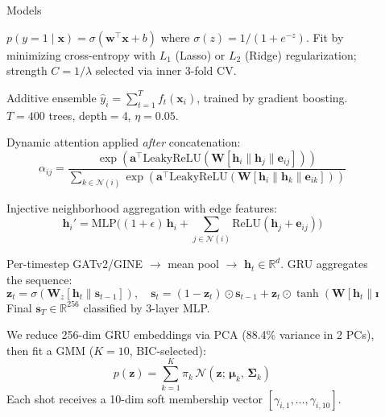 \documentclass[final]{beamer}
\newlength{\sepwidth}
\newlength{\colwidth}
\newcommand{\separatorcolumn}{\begin{column}{\sepwidth}\end{column}}
\begin{document}
\begin{frame}[t]
\begin{columns}[t]
\begin{column}{\colwidth}
\end{column}

\separatorcolumn

\begin{column}{\colwidth}

  \begin{block}{Models}

    $p(y{=}1 \mid \mathbf{x}) = \sigma(\mathbf{w}^\top\mathbf{x} + b)$ where $\sigma(z) = 1/(1+e^{-z})$. Fit by minimizing cross-entropy with $L_1$ (Lasso) or $L_2$ (Ridge) regularization; strength $C = 1/\lambda$ selected via inner 3-fold CV.

    Additive ensemble $\hat{y}_i = \sum_{t=1}^{T} f_t(\mathbf{x}_i)$, trained by gradient boosting. $T{=}400$ trees, depth$=$4, $\eta{=}0.05$.

    Dynamic attention applied \textit{after} concatenation:
    \vspace{-0.8em}
    $$\alpha_{ij} = \frac{\exp(\mathbf{a}^\top \text{LeakyReLU}(\mathbf{W}[\mathbf{h}_i \| \mathbf{h}_j \| \mathbf{e}_{ij}]))}{\sum_{k \in \mathcal{N}(i)} \exp(\mathbf{a}^\top \text{LeakyReLU}(\mathbf{W}[\mathbf{h}_i \| \mathbf{h}_k \| \mathbf{e}_{ik}]))}$$
    \vspace{-0.8em}

    Injective neighborhood aggregation with edge features:
    \vspace{-0.8em}
    $$\mathbf{h}_i' = \text{MLP}\!\Big((1{+}\epsilon)\,\mathbf{h}_i + \sum_{j \in \mathcal{N}(i)} \text{ReLU}(\mathbf{h}_j + \mathbf{e}_{ij})\Big)$$
    \vspace{-0.8em}

    Per-timestep GATv2/GINE $\to$ mean pool $\to$ $\mathbf{h}_t {\in} \mathbb{R}^{d}$. GRU aggregates the sequence:
    \vspace{-0.8em}
    $$\mathbf{z}_t = \sigma(\mathbf{W}_z[\mathbf{h}_t \| \mathbf{s}_{t-1}]),\quad \mathbf{s}_t = (1{-}\mathbf{z}_t)\odot\mathbf{s}_{t-1} + \mathbf{z}_t\odot\tanh(\mathbf{W}[\mathbf{h}_t \| \mathbf{r}_t{\odot}\mathbf{s}_{t-1}])$$
    \vspace{-0.5em}
    Final $\mathbf{s}_T {\in} \mathbb{R}^{256}$ classified by 3-layer MLP.

    We reduce 256-dim GRU embeddings via PCA (88.4\% variance in 2 PCs), then fit a GMM ($K{=}10$, BIC-selected):
    \vspace{-0.8em}
    $$p(\mathbf{z}) = \sum_{k=1}^{K} \pi_k \,\mathcal{N}(\mathbf{z};\, \boldsymbol{\mu}_k,\, \boldsymbol{\Sigma}_k)$$
    \vspace{-0.8em}
    Each shot receives a 10-dim soft membership vector $[\gamma_{i,1}, \ldots, \gamma_{i,10}]$.
  \end{block}


\end{column}
\end{columns}
\end{frame}
\end{document}
